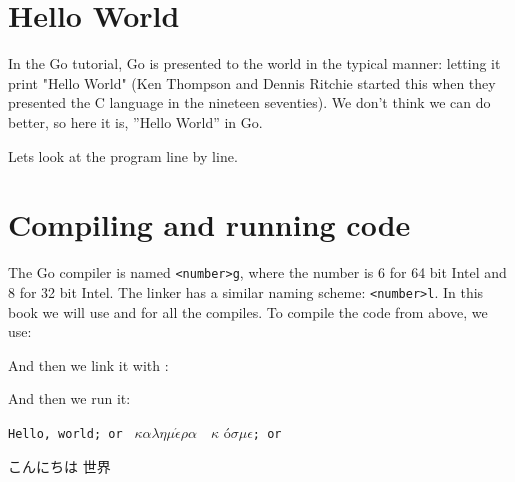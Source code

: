 \section{Hello World}
\label{sec:hello world}
In the Go tutorial, Go is presented to the world in the typical
manner: letting it print "Hello World" (Ken Thompson and
Dennis Ritchie started this when they presented the C language in 
the nineteen seventies). We don't think we can do better, so 
here it is, ''Hello World'' in Go.


Lets look at the program line by line.
\showremarks

\section{Compiling and running code}
The Go compiler is named \verb|<number>g|, where the number is 6 for 64 bit
Intel and 8 for 32 bit Intel. The linker has a similar naming scheme:
\verb|<number>l|. In this book we will use  and  for
all the compiles. To compile the code from above, we use:
\begin{display}
\pr {}
\end{display}

\noindent{}And then we link it with :
\begin{display}
\pr {}
\end{display}

\noindent{}And then we run it:
\begin{display}
\pr {}	    
\end{display}
\vspace{-3.0ex}
\texttt{Hello, world; or }%
\begin{math}\kappa\alpha\lambda\eta\mu\acute{\epsilon}\rho\alpha\hspace{1em}\kappa\end{math}%
\'o\begin{math} \sigma\mu\epsilon\end{math}\texttt{; or }\begin{cjk}こんにちは 世界\end{cjk}
\ \newline
\ \newline

